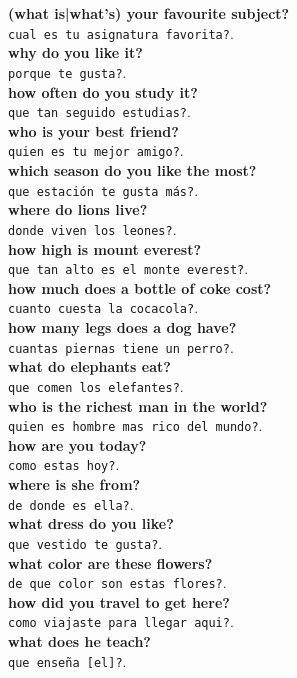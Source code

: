 \documentclass[twocolumn]{article}
\begin{document}
  \textbf{(what is|what's) your favourite subject?}\\\texttt{cual es tu asignatura favorita?}.\\
  \textbf{why do you like it?}\\\texttt{porque te gusta?}.\\
  \textbf{how often do you study it?}\\\texttt{que tan seguido estudias?}.\\
  \textbf{who is your best friend?}\\\texttt{quien es tu mejor amigo?}.\\
  \textbf{which season do you like the most?}\\\texttt{que estaci\'on te gusta m\'as?}.\\
  \textbf{where do lions live?}\\\texttt{donde viven los leones?}.\\
  \textbf{how high is mount everest?}\\\texttt{que tan alto es el monte everest?}.\\
  \textbf{how much does a bottle of coke cost?}\\\texttt{cuanto cuesta la cocacola?}.\\
  \textbf{how many legs does a dog have?}\\\texttt{cuantas piernas tiene un perro?}.\\
  \textbf{what do elephants eat?}\\\texttt{que comen los elefantes?}.\\
  \textbf{who is the richest man in the world?}\\\texttt{quien es hombre mas rico del mundo?}.\\
  \textbf{how are you today?}\\\texttt{como estas hoy?}.\\
  \textbf{where is she from?}\\\texttt{de donde es ella?}.\\
  \textbf{what dress do you like?}\\\texttt{que vestido te gusta?}.\\
  \textbf{what color are these flowers?}\\\texttt{de que color son estas flores?}.\\
  \textbf{how did you travel to get here?}\\\texttt{como viajaste para llegar aqui?}.\\
  \textbf{what does he teach?}\\\texttt{que ense\~na [el]?}.\\
\end{document}
